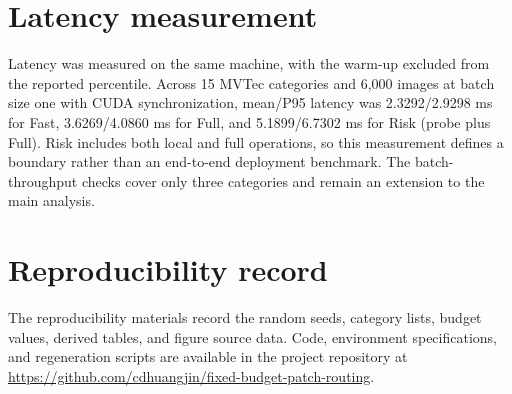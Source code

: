 \documentclass[pdflatex,sn-basic,Numbered]{sn-jnl}
\begin{document}
\section{Latency measurement}
Latency was measured on the same machine, with the warm-up excluded from the reported percentile. Across 15 MVTec categories and 6,000 images at batch size one with CUDA synchronization, mean/P95 latency was 2.3292/2.9298 ms for Fast, 3.6269/4.0860 ms for Full, and 5.1899/6.7302 ms for Risk (probe plus Full). Risk includes both local and full operations, so this measurement defines a boundary rather than an end-to-end deployment benchmark. The batch-throughput checks cover only three categories and remain an extension to the main analysis.

\section{Reproducibility record}
The reproducibility materials record the random seeds, category lists, budget values, derived tables, and figure source data. Code, environment specifications, and regeneration scripts are available in the project repository at \url{https://github.com/cdhuangjin/fixed-budget-patch-routing}.
\end{document}
